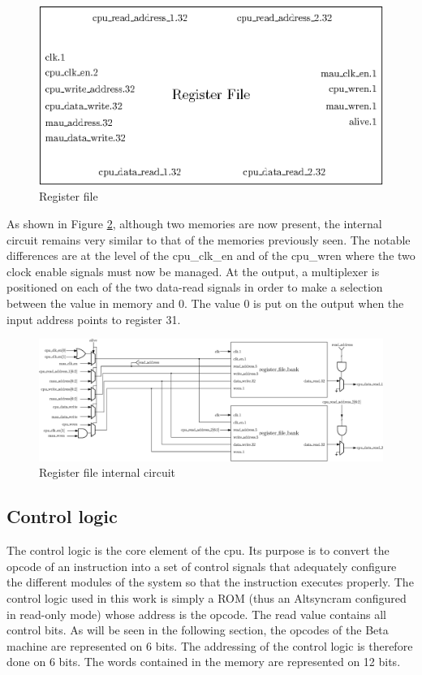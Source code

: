 \begin{figure}[H]
    \centering
    \includegraphics[scale=0.6]{Chapter3-CPU/res/reg_file}
    \caption{Register file}
    \label{fig:components/rf}
\end{figure}

As shown in Figure \ref{fig:components/rf_in}, although two memories are now present, the internal 
circuit remains very similar to that of the memories previously seen. The notable differences are at 
the level of the cpu\_clk\_en and of the cpu\_wren where the two clock enable signals 
must now be managed. At the output, a multiplexer is positioned on each of the two data-read signals in 
order to make a selection between the value in memory and 0. The value 0 is put on the output when 
the input address points to register 31.

\begin{figure}[H]
    \centering
    \includegraphics[width=\linewidth]{Chapter3-CPU/res/reg_file_in}
    \caption{Register file internal circuit}
    \label{fig:components/rf_in}
\end{figure}

\subsection{Control logic}

The control logic is the core element of the cpu. Its purpose is to convert the opcode of an 
instruction into a set of control signals that adequately configure the different modules of 
the system so that the instruction executes properly. The control logic used in this work is simply a 
ROM (thus an Altsyncram configured in read-only mode) whose address is the opcode. The read value 
contains all control bits. As will be seen in the following section, the opcodes of the Beta 
machine are represented on 6 bits. The addressing of the control logic is therefore done on 6 bits. 
The words contained in the memory are represented on 12 bits.

